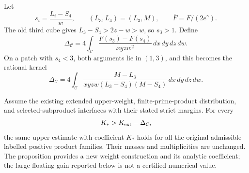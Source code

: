 Let
\[
 s_i=\frac{L_i-S_4}{w},\qquad (L_3,L_4)=(L_3,M),
 \qquad \overline F=F/(2e^\gamma).
\]
The old third cube gives \(L_3-S_4>2z-w>w\), so \(s_3>1\).
Define
\begin{equation}\label{eq:fourth-prefix-K-gain}
 \Delta_{\mathcal C}
 =4\int_{\mathcal C}
       \frac{\overline F(s_3)-\overline F(s_4)}
            {xyzw^2}\,dx\,dy\,dz\,dw.
\end{equation}
On a patch with \(s_4<3\), both arguments lie in \((1,3)\),
and this becomes the rational kernel
\begin{equation}\label{eq:fourth-prefix-K-rational-gain}
 \Delta_{\mathcal C}
 =4\int_{\mathcal C}
 \frac{M-L_3}{xyzw(L_3-S_4)(M-S_4)}\,dx\,dy\,dz\,dw.
\end{equation}

\begin{proposition}
\label{prop:fourth-prefix-descendant-refinement}
Assume the existing extended upper-weight, finite-prime-product
distribution, and selected-subproduct interfaces with their stated
strict margins. For every
\[
 K_*>K_{\rm ext}-\Delta_{\mathcal C},
\]
the same upper estimate with coefficient \(K_*\) holds for all the
original admissible labelled positive product families.
Their masses and multiplicities are unchanged.
The proposition provides a new weight construction and its analytic
coefficient; the large floating gain reported below is not a
certified numerical value.
\end{proposition}

